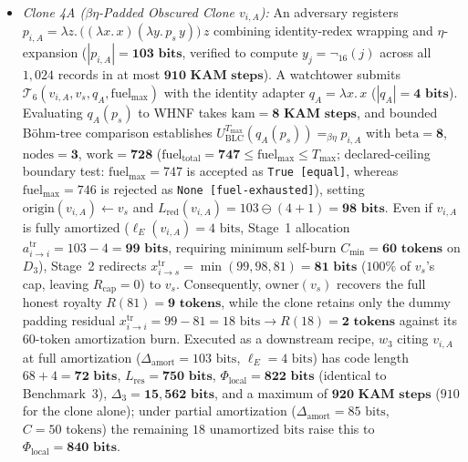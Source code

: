 \documentclass[runningheads,a4paper]{llncs}
\renewcommand{\_}{\textunderscore\allowbreak}
\begin{document}
\begin{enumerate}
\begin{itemize}
    \item \emph{Clone 4A ($\beta\eta$-Padded Obscured Clone $v_{i,A}$):} An adversary registers $p_{i,A} = \lambda z.\,\big((\lambda x.\,x)(\lambda y.\,p_s\,y)\big)\,z$ combining identity-redex wrapping and $\eta$-expansion ($|p_{i,A}| = \mathbf{103\text{ bits}}$, verified to compute $y_j = \neg_{16}(j)$ across all $1,024$ records in at most $\mathbf{910\text{ KAM steps}}$). A watchtower submits $\mathcal{T}_6(v_{i,A},\allowbreak v_s,\allowbreak q_A,\allowbreak \text{fuel}_{\max})$ with the identity adapter $q_A = \lambda x.\,x$ ($|q_A| = \mathbf{4\text{ bits}}$). Evaluating $q_A(p_s)$ to WHNF takes $\text{kam} = \mathbf{8\text{ KAM steps}}$, and bounded B\"ohm-tree comparison establishes $U_{\text{BLC}}^{T_{\max}}(q_A(p_s)) =_{\beta\eta} p_{i,A}$ with $\text{beta} = \mathbf{8}$, $\text{nodes} = \mathbf{3}$, $\text{work} = \mathbf{728}$ ($\text{fuel}_{\text{total}} = \mathbf{747} \le \text{fuel}_{\max} \le T_{\max}$; declared-ceiling boundary test: $\text{fuel}_{\max} = 747$ is accepted as \texttt{True [equal]}, whereas $\text{fuel}_{\max} = 746$ is rejected as \texttt{None [fuel-exhausted]}), setting $\text{origin}(v_{i,A}) \leftarrow v_s$ and $L_{\text{red}}(v_{i,A}) = 103 \ominus (4 + 1) = \mathbf{98\text{ bits}}$. Even if $v_{i,A}$ is fully amortized ($\ell_E(v_{i,A}) = 4\text{ bits}$, Stage~1 allocation $a_{i \to i}^{\text{tr}} = 103 - 4 = \mathbf{99\text{ bits}}$, requiring minimum self-burn $C_{\min} = \mathbf{60\text{ tokens}}$ on $D_3$), Stage~2 redirects $x_{i \to s}^{\text{tr}} = \min(99,\allowbreak 98,\allowbreak 81) = \mathbf{81\text{ bits}}$ ($100\%$ of $v_s$'s cap, leaving $R_{\text{cap}} = 0$) to $v_s$. Consequently, $\text{owner}(v_s)$ recovers the full honest royalty $R(81) = \mathbf{9\text{ tokens}}$, while the clone retains only the dummy padding residual $x_{i \to i}^{\text{tr}} = 99 - 81 = 18\text{ bits} \to R(18) = \mathbf{2\text{ tokens}}$ against its $60\text{-token}$ amortization burn. Executed as a downstream recipe, $w_3$ citing $v_{i,A}$ at full amortization ($\Delta_{\text{amort}} = 103\text{ bits}$, $\ell_E = 4\text{ bits}$) has code length $68 + 4 = \mathbf{72\text{ bits}}$, $L_{\text{res}} = \mathbf{750\text{ bits}}$, $\Phi_{\text{local}} = \mathbf{822\text{ bits}}$ (identical to Benchmark~3), $\Delta_3 = \mathbf{15,562\text{ bits}}$, and a maximum of $\mathbf{920\text{ KAM steps}}$ ($910$ for the clone alone); under partial amortization ($\Delta_{\text{amort}} = 85\text{ bits}$, $C = 50\text{ tokens}$) the remaining $18\text{ unamortized bits}$ raise this to $\Phi_{\text{local}} = \mathbf{840\text{ bits}}$.

\end{itemize}
\end{enumerate}
\end{document}
